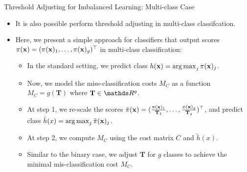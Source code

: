 \documentclass[11pt,compress,t,notes=noshow, xcolor=table]{beamer}
\begin{document}
\begin{vbframe}{Threshold Adjusting for Imbalanced Learning: Multi-class Case}
    \footnotesize
    \begin{itemize}
        \footnotesize
        \item It is also possible perform threshold adjusting in multi-class classifcation.
        
        \item Here, we present a simple approach for classifiers that output scores $\pi(\mathbf{x}) = (\pi(\mathbf{x})_1,\ldots,\pi(\mathbf{x})_g)^\top$ in multi-class classification:
        
        \begin{itemize}
            \footnotesize
            \item In the standard setting, we predict class $h(\mathbf{x}) = \operatorname{arg\,max}_{j} \pi(\mathbf{x})_j$.
            \vspace{10pt}
            
            \item Now, we model the miss-classification costs $M_C$ as a function $M_C = g(\mathbf{T})$ where $\mathbf{T} \in \R^{g}$.
            \vspace{10pt}
            
            \item At step 1, we re-scale the scores $\tilde{\pi}(\mathbf{x}) = (\frac{\pi(\mathbf{x})_1}{\mathbf{T}_1},\ldots, \frac{\pi(\mathbf{x})_g}{ \mathbf{T}_g})^\top$, and predict class $\tilde{h}(x) = \operatorname{arg\,max}_j \tilde{\pi}(\mathbf{x})_j$.
            \vspace{10pt}

            \item At step 2, we compute $M_C$ using the cost matrix $C$ and $\tilde{h}(x)$.
            \vspace{10pt}

            \item Similar to the binary case, we adjust $\mathbf{T}$ for $g$ classes to achieve the minimal mis-classification cost $M_C$.
            \vspace{10pt}

        \end{itemize}
    \end{itemize}
\end{vbframe}
\end{document}
